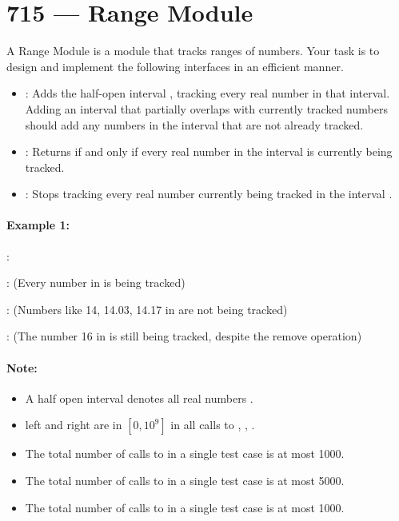 \section{715 --- Range Module}
A Range Module is a module that tracks ranges of numbers. Your task is to design and implement the following interfaces in an efficient manner.

\begin{itemize}
\item {}: Adds the half-open interval \fcj{[left, right)}, tracking every real number in that interval. Adding an interval that partially overlaps with currently tracked numbers should add any numbers in the interval \fcj{[left, right)} that are not already tracked.

\item {}: Returns  if and only if every real number in the interval \fcj{[left, right)} is currently being tracked.

\item {}: Stops tracking every real number currently being tracked in the interval \fcj{[left, right)}.

\end{itemize}

\paragraph{Example 1:}

\begin{flushleft}
: 

 

:  (Every number in \fcj{[10, 14)} is being tracked)

:  (Numbers like 14, 14.03, 14.17 in \fcj{[13, 15)} are not being tracked)

:  (The number 16 in \fcj{[16, 17)} is still being tracked, despite the remove operation)
\end{flushleft}

\paragraph{Note:}
\begin{itemize}
\item A half open interval \fcj{[left, right)} denotes all real numbers .
\item left and right are in $[0, 10^9]$ in all calls to , , .
\item The total number of calls to  in a single test case is at most 1000.
\item The total number of calls to  in a single test case is at most 5000.
\item The total number of calls to  in a single test case is at most 1000.
\end{itemize}


